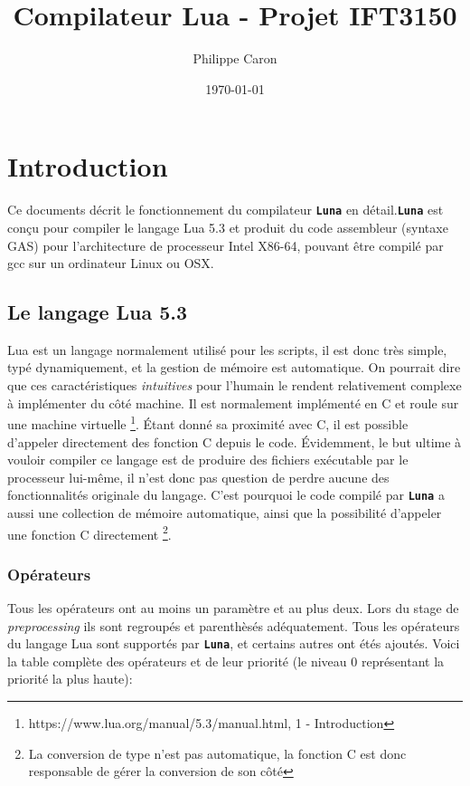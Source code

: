 \documentclass{article}
\title{Compilateur Lua - Projet IFT3150}
\date{\today}
\author{Philippe Caron}
\newcommand{\luna}{\textbf{\texttt{Luna}}}
\begin{document}
\maketitle

\newpage
\section{Introduction}
Ce documents décrit le fonctionnement du compilateur \luna{} en détail.\luna{} est conçu pour compiler le langage Lua 5.3 et produit du code assembleur (syntaxe GAS) pour l'architecture de processeur Intel X86-64, pouvant être compilé par gcc sur un ordinateur Linux ou OSX.

\subsection{Le langage Lua 5.3}
Lua est un langage normalement utilisé pour les scripts, il est donc très simple, typé dynamiquement, et la gestion de mémoire est automatique. On pourrait dire que ces caractéristiques \textit{intuitives} pour l'humain le rendent relativement complexe à implémenter du côté machine. Il est normalement implémenté en C et roule sur une machine virtuelle \footnote{https://www.lua.org/manual/5.3/manual.html, 1 - Introduction}. Étant donné sa proximité avec C, il est possible d'appeler directement des fonction C depuis le code. Évidemment, le but ultime à vouloir compiler ce langage est de produire des fichiers exécutable par le processeur lui-même, il n'est donc pas question de perdre aucune des fonctionnalités originale du langage. C'est pourquoi le code compilé par \luna{} a aussi une collection de mémoire automatique, ainsi que la possibilité d'appeler une fonction C directement \footnote{La conversion de type n'est pas automatique, la fonction C est donc responsable de gérer la conversion de son côté}.

\subsubsection{Opérateurs}
Tous les opérateurs ont au moins un paramètre et au plus deux. Lors du stage de \textit{preprocessing} ils sont regroupés et parenthèsés adéquatement.
Tous les opérateurs du langage Lua sont supportés par \luna{}, et certains autres ont étés ajoutés. Voici la table complète des opérateurs et de leur priorité (le niveau 0 représentant la priorité la plus haute):
\end{document}

